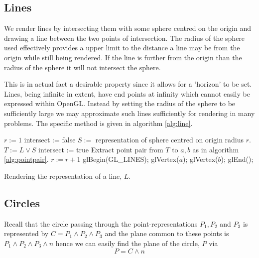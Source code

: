 \subsection{Lines}

We render lines by intersecting them with some sphere centred on the origin
and drawing a line between the two points of intersection. The radius of the
sphere used effectively provides a upper limit to the distance a line may be
from the origin while still being rendered. If the line is further from the 
origin than the radius of the sphere it will not intersect the sphere.

This is in actual fact a desirable property since it allows for a 'horizon' to
be set. Lines, being infinite in extent, have end points at infinity which
cannot easily be expressed within OpenGL. Instead by setting the radius of the sphere
to be sufficiently large we may approximate such lines sufficiently for rendering
in many problems. The specific method is given in algorithm \ref{alg:line}.

\begin{fancyalg}
\begin{algorithmic}[1]
\STATE $r := 1$
\REPEAT
\STATE intersect := false
\STATE $S := $ representation of sphere centred on origin radius $r$.
\STATE $T := L \vee S$
\STATE intersect := true
\STATE Extract point pair from $T$ to $a,b$ as in algorithm \ref{alg:pointpair}.
\ENDIF
\STATE $r := r+1$
\STATE glBegin(GL\_LINES);
\STATE glVertex($a$); glVertex($b$);
\STATE glEnd();
\ENDIF
\end{algorithmic}
\caption{\label{alg:line}Rendering the representation of a line, $L$.}
\end{fancyalg}

%


\subsection{Circles}

Recall that the circle passing through the point-representations $P_1, P_2$ and $P_3$
is represented by $C = P_1 \wedge P_2 \wedge P_3$ and the plane common to these points is
$P_1 \wedge P_2 \wedge P_3 \wedge n$ hence we can easily find the plane of 
the circle, $P$ via
\[
P = C \wedge n
\]

